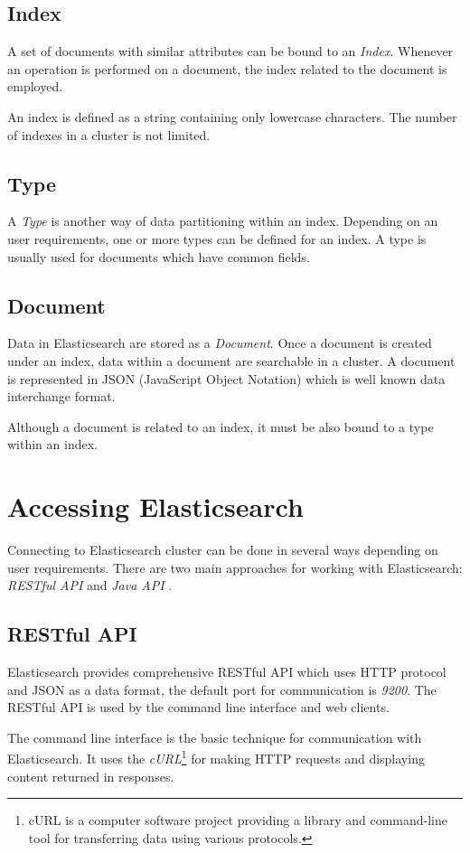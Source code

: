 \documentclass[12pt,oneside]{fithesis2}
\begin{document}
\subsection{Index}
A set of documents with similar attributes can be bound to an \textit{Index}. Whenever an operation is performed on a document, the index related to the document is employed.

An index is defined as a string containing only lowercase characters. The number of indexes in a cluster is not limited.

\subsection{Type}
A \textit{Type} is another way of data partitioning within an index. Depending on an user requirements, one or more types can be defined for an index. A type is usually used for documents which have common fields.

\subsection{Document}
Data in Elasticsearch are stored as a \textit{Document}. Once a document is created under an index, data within a document are searchable in a cluster. A document is represented in JSON (JavaScript Object Notation) which is well known data interchange format.

Although a document is related to an index, it must be also bound to a type within an index.

\section{Accessing Elasticsearch}
Connecting to Elasticsearch cluster can be done in several ways depending on user requirements. There are two main approaches for working with Elasticsearch: \textit{RESTful API} and \textit{Java API} \cite[Talking to Elasticsearch]{elasticsearch_defnitive_guide}.

\subsection{RESTful API}
Elasticsearch provides comprehensive RESTful API which uses HTTP protocol and JSON as a data format, the default port for communication is \textit{9200}. The RESTful API is used by the command line interface and web clients.

The command line interface is the basic technique for communication with Elasticsearch. It uses the \textit{cURL}\footnote{cURL is a computer software project providing a library and command-line tool for transferring data using various protocols.} for making HTTP requests and displaying content returned in responses.
\end{document}
